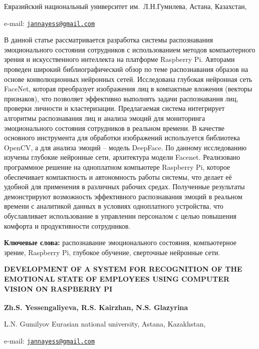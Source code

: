 \begin{affiliation}
Евразийский национальный университет им.~Л.Н.Гумилева, Астана, Казахстан,

e-mail: \href{mailto:jannayess@gmail.com}{\nolinkurl{jannayess@gmail.com}}
\end{affiliation}

В данной статье рассматривается разработка системы распознавания
эмоционального состояния сотрудников с использованием методов
компьютерного зрения и искусственного интеллекта на платформе Raspberry
Pi. Авторами проведен широкий библиографический обзор по теме
распознавания образов на основе конволюционных нейронных сетей.
Исследована глубокая нейронная сеть FaceNet, которая преобразует
изображения лиц в компактные вложения (векторы признаков), что позволяет
эффективно выполнять задачи распознавания лиц, проверки личности и
кластеризации. Предлагаемая система интегрирует алгоритмы распознавания
лиц и анализа эмоций для мониторинга эмоционального состояния
сотрудников в реальном времени. В качестве основного инструмента для
обработки изображений используется библиотека OpenCV, а для анализа
эмоций -- модель DeepFace. По данному исследованию изучены глубокие
нейронные сети, архитектура модели Facenet. Реализовано программное
решение на одноплатном компьютере Raspberry Pi, которое обеспечивает
компактность и автономность работы системы, что делает её удобной для
применения в различных рабочих средах. Полученные результаты
демонстрируют возможность эффективного распознавания эмоций в реальном
времени с аналитикой данных в условиях одноплатного устройства, что
обуславливает использование в управлении персоналом с целью повышения
комфорта и продуктивности сотрудников.

{\bfseries Ключевые слова:} распознавание эмоционального состояния,
компьютерное зрение, Raspberry Pi, глубокое обучение, сверточные
нейронные сети.

\begin{articleheader}
{\bfseries DEVELOPMENT OF A SYSTEM FOR RECOGNITION OF THE EMOTIONAL STATE
OF EMPLOYEES USING COMPUTER VISION ON RASPBERRY PI}

{\bfseries
Zh.S. Yessengaliyeva\textsuperscript{\envelope },
R.S. Kairzhan,
N.S. Glazyrina
}
\end{articleheader}

\begin{affiliation}
L.N. Gumilyov Eurasian national university, Astana, Kazakhstan,

e-mail: \href{mailto:jannayess@gmail.com}{\nolinkurl{jannayess@gmail.com}}
\end{affiliation}

